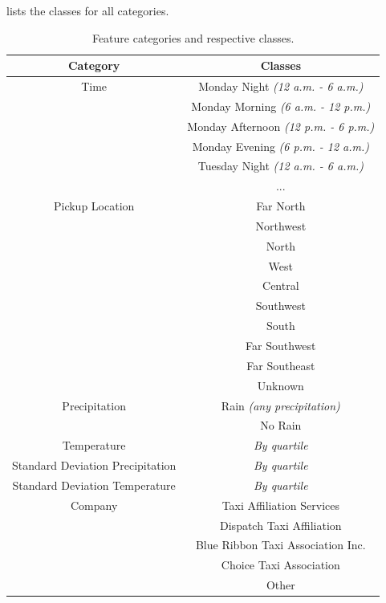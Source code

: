 \documentclass[twoside,11pt]{article}
\begin{document}
 lists the classes for all categories.

\begin{table}[H]
    \centering
    \begin{tabular}{c|c}
        Category & Classes \\
        \hline
        \hline
        Time & Monday Night \textit{(12 a.m. - 6 a.m.)} \\
         & Monday Morning \textit{(6 a.m. - 12 p.m.)} \\
         & Monday Afternoon \textit{(12 p.m. - 6 p.m.)} \\
         & Monday Evening \textit{(6 p.m. - 12 a.m.)} \\
         & Tuesday Night \textit{(12 a.m. - 6 a.m.)} \\
         & ... \\
         \hline
         Pickup Location & Far North \\
         & Northwest \\
         & North \\
         & West \\
         & Central \\
         & Southwest \\
         & South \\
         & Far Southwest \\
         & Far Southeast \\
         & Unknown \\
         \hline
         Precipitation & Rain \textit{(any precipitation)} \\
         & No Rain \\
         \hline
         Temperature & \textit{By quartile} \\
         \hline
         Standard Deviation Precipitation & \textit{By quartile} \\
         \hline
         Standard Deviation Temperature & \textit{By quartile} \\
         \hline
         Company & Taxi Affiliation Services \\
         & Dispatch Taxi Affiliation \\
         & Blue Ribbon Taxi Association Inc. \\
         & Choice Taxi Association \\
         & Other
    \end{tabular}
    \caption{Feature categories and respective classes.}
    \label{tab:categories_classes}
\end{table}
\end{document}
